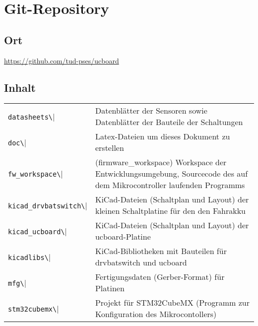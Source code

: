 

\chapter{Git-Repository}


\section{Ort}

\href{https://github.com/tud-pses/ucboard}{\color[rgb]{0,0,1}https://github.com/tud-pses/ucboard}

\section{Inhalt}

\begin{tabular}{lp{12cm}}
	\verb|datasheets\| & Datenblätter der Sensoren sowie Datenblätter der Bauteile der Schaltungen \\
	\verb|doc\| & Latex-Dateien um dieses Dokument zu erstellen \\
	\verb|fw_workspace\| & (firmware\_workspace) Workspace der Entwicklungsumgebung, Sourcecode des auf dem Mikrocontroller laufenden Programms \\
	\verb|kicad_drvbatswitch\| & KiCad-Dateien (Schaltplan und Layout) der kleinen Schaltplatine für den den Fahrakku \\
	\verb|kicad_ucboard\| & KiCad-Dateien (Schaltplan und Layout) der ucboard-Platine \\
	\verb|kicadlibs\| & KiCad-Bibliotheken mit Bauteilen für drvbatswitch und ucboard \\
	\verb|mfg\| & Fertigungsdaten (Gerber-Format) für Platinen \\
	\verb|stm32cubemx\| & Projekt für STM32CubeMX (Programm zur Konfiguration des Mikrocontollers) \\
\end{tabular}

